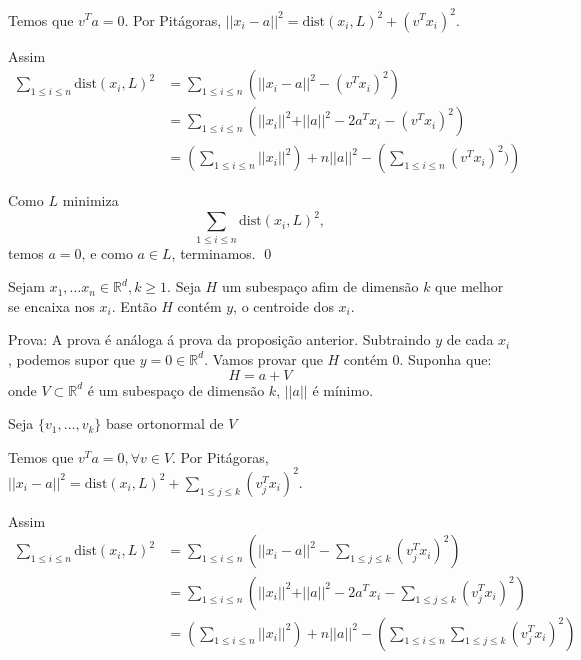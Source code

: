 Temos que $v^Ta=0$. Por Pit\'agoras, $\vert\vert x_i - a \vert \vert ^2 = \text{dist} (x_i,L)^2 + (v^Tx_i)^2$.

Assim
\begin{align*}
\sum _{1\le i \le n} \text{dist}(x_i,L)^2&=\sum _{1\le i \le n} \left(\vert\vert x_i - a \vert \vert ^2 - (v^Tx_i)^2\right)\\
										 &=\sum_{1\le i \le n} \left(\vert\vert x_i\vert \vert ^2 + \vert\vert a\vert \vert^2 - 2a^Tx_i - (v^Tx_i)^2\right)\\ 
										 &= \left(\sum _{1\le i \le n} \vert\vert x_i\vert \vert ^2 \right)+ n \vert\vert a \vert \vert ^2 - \left(\sum _{1\le i \le n}(v^Tx_i)^2)\right)
\end{align*}

Como $L$ minimiza 
\[\sum _{1\le i \le n} \text{dist}(x_i,L)^2,\]
temos $a=0$, e como $a\in L$, terminamos. \qed


\begin{proposicao} 
Sejam $x_1,\dots x_n \in \mathbb{R}^d, k \ge 1$. Seja $H$ um subespa\c{c}o afim de dimens\~ao $k$ que melhor se encaixa nos $x_i$. Ent\~ao $H$ cont\'em $y$, o centroide dos $x_i$.
\end{proposicao}
Prova: A prova \'e an\'aloga \'a prova da proposi\c{c}\~ao anterior. Subtraindo $y$ de cada $x_i$, podemos supor que $y=0\in \mathbb{R}^d$. Vamos provar que $H$ cont\'em $0$. Suponha que:
\[H = a + V\]
onde $V \subset \mathbb{R}^d$ \'e um subespa\c{c}o de dimens\~ao $k$, $\vert\vert a \vert \vert$ \'e m\'inimo.

Seja $\{v_1,\dots,v_k\}$ base ortonormal de $V$

Temos que $v^Ta=0,\forall v \in V$. Por Pit\'agoras, $\vert\vert x_i - a \vert \vert ^2 = \text{dist} (x_i,L)^2 + \displaystyle\sum_{1\le j \le k}(v_j^Tx_i)^2$.

Assim
\begin{align*}
\sum _{1\le i \le n} \text{dist}(x_i,L)^2&=\sum _{1\le i \le n} \left(\vert\vert x_i - a \vert \vert ^2 - \sum_{1\le j \le k}(v_j^Tx_i)^2\right)\\
										 &=\sum_{1\le i \le n} \left(\vert\vert x_i\vert \vert ^2 + \vert\vert a\vert \vert^2 - 2a^Tx_i - \sum_{1\le j \le k}(v_j^Tx_i)^2\right)\\ 
										 &= \left(\sum _{1\le i \le n} \vert\vert x_i\vert \vert ^2 \right)+ n \vert\vert a \vert \vert ^2 - \left(\sum _{1\le i \le n}\sum_{1\le j \le k}(v_j^Tx_i)^2\right)
\end{align*}

